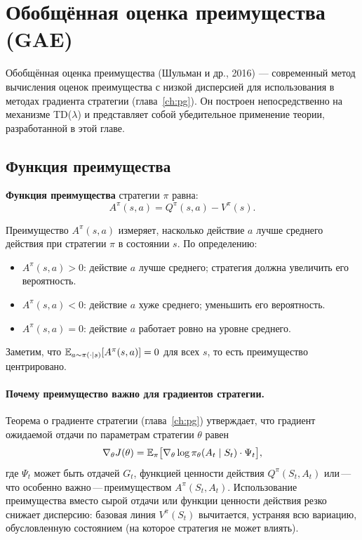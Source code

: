 \section{Обобщённая оценка преимущества (GAE)}
\label{sec:gae}

Обобщённая оценка преимущества (Шульман и др., 2016) --- современный метод вычисления оценок преимущества с низкой дисперсией для использования в методах градиента стратегии (глава~\ref{ch:pg}).  Он построен непосредственно на механизме TD($\lambda$) и представляет собой убедительное применение теории, разработанной в этой главе.

\subsection{Функция преимущества}

\begin{definition}
\label{def:advantage}
\textbf{Функция преимущества} стратегии $\pi$ равна:
\begin{equation}
\label{eq:advantage}
A^\pi(s,a) = Q^\pi(s,a) - V^\pi(s).
\end{equation}
\end{definition}

Преимущество $A^\pi(s,a)$ измеряет, насколько действие $a$ лучше среднего действия при стратегии $\pi$ в состоянии $s$.  По определению:
\begin{itemize}[leftmargin=*]
  \item $A^\pi(s,a) > 0$: действие $a$ лучше среднего; стратегия должна увеличить его вероятность.
  \item $A^\pi(s,a) < 0$: действие $a$ хуже среднего; уменьшить его вероятность.
  \item $A^\pi(s,a) = 0$: действие $a$ работает ровно на уровне среднего.
\end{itemize}
Заметим, что $\operatorname{\mathbb{E}}_{a\sim\pi(\cdot|s)}[A^\pi(s,a)] = 0$ для всех $s$, то есть преимущество центрировано.

\paragraph{Почему преимущество важно для градиентов стратегии.}
Теорема о градиенте стратегии (глава~\ref{ch:pg}) утверждает, что градиент ожидаемой отдачи по параметрам стратегии $\theta$ равен
\[
\nabla_\theta J(\theta) = \operatorname{\mathbb{E}}_\pi\bigl[\nabla_\theta\log\pi_\theta(A_t\mid S_t)\cdot\Psi_t\bigr],
\]
где $\Psi_t$ может быть отдачей $G_t$, функцией ценности действия $Q^\pi(S_t,A_t)$ или\,---\,что особенно важно\,---\,преимуществом $A^\pi(S_t,A_t)$.  Использование преимущества вместо сырой отдачи или функции ценности действия резко снижает дисперсию: базовая линия $V^\pi(S_t)$ вычитается, устраняя всю вариацию, обусловленную состоянием (на которое стратегия не может влиять).

